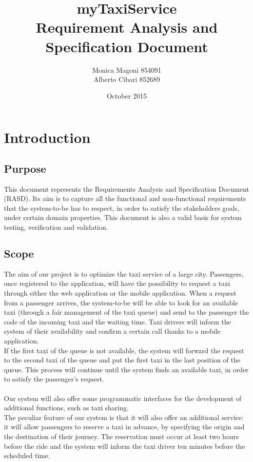 \documentclass{article}
\title{
	\textbf{\Huge{myTaxiService}}
	\\
	\huge{\textbf{R}equirement \textbf{A}nalysis and \textbf{S}pecification \textbf{D}ocument}
}
\author{
	Monica Magoni 854091\\
	Alberto Cibari 852689
}
\date{October 2015}
\begin{document}
	
	\begin{comment}
	    Pagina Titolo
	\end{comment}
	\maketitle
	
	
	\begin{comment}
    	Pagina Indici
	\end{comment}
	\newpage
	\renewcommand*\contentsname{\Huge{Summary}}
	\tableofcontents
	
\newpage
	
\section{Introduction}
	
	\subsection{Purpose}
    	This document represents the Requirements Analysis and Specification Document (RASD).
    	Its aim is to capture all the functional and non-functional requirements that the system-to-be has to respect, in order to satisfy the stakeholders goals, under certain domain properties. This document is also a valid basis for system testing, verification and validation.
	
	\subsection{Scope}
    	The aim of our project is to optimize the taxi service of a large city. 
    	Passengers, once registered to the application, will have the possibility to request a taxi through either the web application or the mobile application. When a request from a passenger arrives, the system-to-be will be able to look for an available taxi (through a fair management of the taxi queue) and send to the passenger the code of the incoming taxi and the waiting time. Taxi drivers will inform the system of their availability and confirm a certain call thanks to a mobile application.\\
    	If the first taxi of the queue is not available, the system will forward the request to the second taxi of the queue and put the first taxi in the last position of the queue. This process will continue until the system finds an available taxi, in order to satisfy the passenger's request.\\\\
    	Our system will also offer some programmatic interfaces for the development of additional functions, such as taxi sharing.\\
    	The peculiar feature of our system is that it will also offer an additional service: it will allow passengers to reserve a taxi in advance, by specifying the origin and the destination of their journey. The reservation must occur at least two hours before the ride and the system will inform the taxi driver ten minutes before the scheduled time.
	
\end{document}
